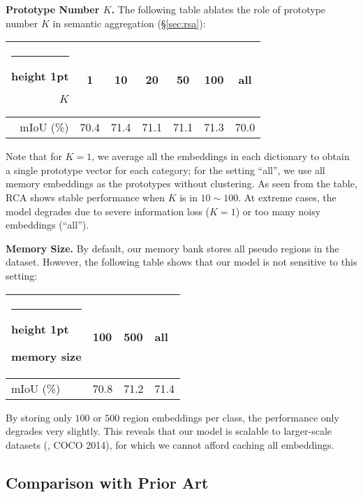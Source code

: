 \documentclass[10pt,twocolumn,letterpaper]{article}
\makeatletter
\newcommand{\thickhline}{\noalign {\ifnum 0=`}\fi \hrule height 1pt
	\futurelet \reserved@a \@xhline
}
\newcommand{\tablestyle}[2]{\setlength{\tabcolsep}{#1}\renewcommand{\arraystretch}{#2}\centering\footnotesize}
\makeatother
\begin{document}
\noindent\textbf{Prototype Number $K$.} The following table ablates the role of prototype number $K$ in semantic aggregation (\S\ref{sec:rsa}):
\vspace{-6pt}
\begin{table}[H]
	\small\centering
		\tablestyle{8pt}{1.05}
		\begin{tabular}{|r|cccccc|}
			\thickhline
$K$                                   & 1  & 10 & 20 & 50 & 100 & all \\ \hline		 
			mIoU (\%)           			   & 70.4 & 71.4 & 71.1 & 71.1 & 71.3 & 70.0  \\ \hline		 	
	\end{tabular}
	\vspace{-10pt}
\end{table}
\noindent  Note that for $K\!=\!1$, we  average all the embeddings in each dictionary to obtain a single prototype vector for each category; for the setting ``all'', we use all memory embeddings as the prototypes without clustering. As seen from the table, RCA shows stable performance when $K$ is in $10\!\sim\!100$. At extreme cases, the model degrades due to severe information loss ($K\!=\!1$) or too many noisy embeddings (``all'').






\noindent\textbf{Memory Size.} By default, our memory bank stores all pseudo regions in the  dataset. However, the following table shows that our model is not sensitive to this setting:
\vspace{-6pt}
\begin{table}[H]
	\small
	\centering	
	\tablestyle{1pt}{1.05}
	\begin{tabular}{|z{50}|x{55}x{55}x{55}|}
		\thickhline
memory size 
		& 100 & 500 & all  \\ \hline		 
		mIoU (\%)           						 
		& 70.8 & 71.2 & 71.4  \\ \hline		 
	\end{tabular}
	\vspace{-10pt}
\end{table}
\noindent By storing only $100$ or $500$ region embeddings per class, the performance only degrades very slightly. This reveals that our model is scalable to larger-scale datasets (\eg, COCO 2014), for which we cannot afford caching all embeddings.





\subsection{Comparison with Prior Art}
\end{document}
